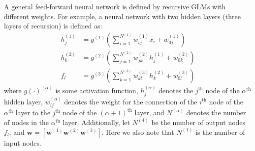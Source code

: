 A general feed-forward neural network is defined by recursive GLMs
with different weights.
For example, a neural network with two hidden layers
(three layers of recursion) is defined as:
%
\begin{equation}
\begin{aligned}
	h^{(1)}_j &= g^{(1)}
		\left(\sum_{i=1}^{N^{(1)}} w_{ij}^{(1)} x_i + 
      w^{(1)}_{0j} \right) \\
	h^{(2)}_k &= g^{(2)}
		\left(\sum_{j=1}^{N^{(2)}} w_{jk}^{(2)} h_j^{(1)} + 
      w^{(2)}_{0k} \right) \\
	f_l &= g^{(3)}
		\left(\sum_{k=1}^{N^{(3)}} w_{kl}^{(3)} h_k^{(2)} + 
      w^{(3)}_{0l} \right)
\end{aligned}
\end{equation}
%
where $g(\cdot)^{(\alpha)}$ is some activation function,
$h^{(\alpha)}_j$ denotes the $j^\text{th}$ node of the $\alpha^\text{th}$ 
hidden layer,
$w_{ij}^{(\alpha)}$ denotes the weight for the connection of 
the $i^\text{th}$ node of the $\alpha^\text{th}$ layer to 
the $j^\text{th}$ node of the $(\alpha+1)^\text{th}$ layer,
and $N^{(\alpha)}$ denotes the number of nodes in the $\alpha^\text{th}$ layer.
Additionally, let $N^{(4)}$ be the number of 
output nodes $f_l$,
and $\mathbf{w} = \left[\mathbf{w}^{(1)} \mathbf{w}^{(2)} \mathbf{w}^{(3)} \right]$.
Here we also note that $N^{(1)}$ is the number of input nodes.

